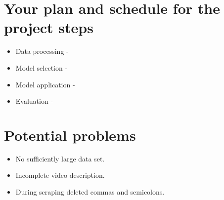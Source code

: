 \documentclass[12pt,a4paper]{scrartcl}
\begin{document}
\section{Your plan and schedule for the project steps}
\begin{itemize}
    \item Data processing -
    \item Model selection -
    \item Model application -
    \item Evaluation -
\end{itemize}
\section{Potential problems}
\begin{itemize}
    \item No sufficiently large data set.
    \item Incomplete video description.
    \item During scraping deleted commas and semicolons.
\end{itemize}
\end{document}
